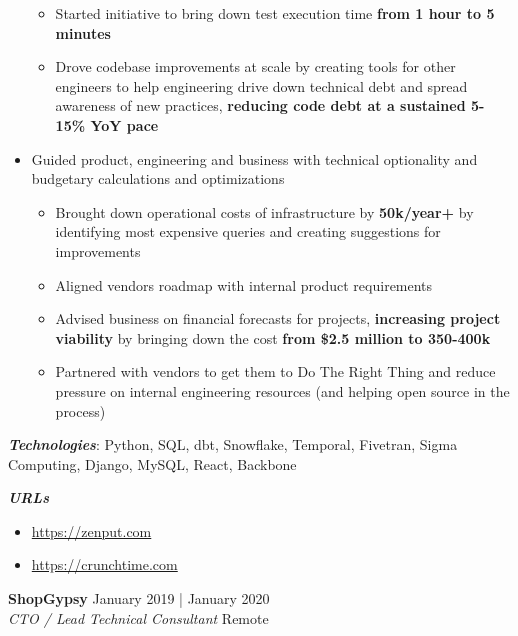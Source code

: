 \documentclass[a4paper]{article}
\newenvironment{jobdetails}%
    {\list{}{\leftmargin=4mm}\item[]}%
    {\endlist}
\begin{document}
\begin{jobdetails}
\begin{itemize}
\begin{itemize}
            \item Started initiative to bring down test execution time \textbf{from 1 hour to 5 minutes}
            \item Drove codebase improvements at scale by creating tools for other engineers to help engineering drive down technical debt and spread awareness of new practices, \textbf{reducing code debt at a sustained 5-15\% YoY pace}
        \end{itemize}
    \item Guided product, engineering and business with technical optionality and budgetary calculations and optimizations
        \begin{itemize}
            \item Brought down operational costs of infrastructure by \textbf{50k/year+} by identifying most expensive queries and creating suggestions for improvements
            \item Aligned vendors roadmap with internal product requirements
            \item Advised business on financial forecasts for projects, \textbf{increasing project viability} by bringing down the cost \textbf{from \$2.5 million to 350-400k}
            \item Partnered with vendors to get them to Do The Right Thing and reduce pressure on internal engineering resources (and helping open source in the process)
        \end{itemize}
\end{itemize}
\vspace{2mm}

\textbf{\textit{Technologies}}: Python, SQL, dbt, Snowflake, Temporal, Fivetran, Sigma Computing, Django, MySQL, React, Backbone

\textbf{\textit{URLs}}
\begin{itemize} \itemsep 1pt
	\item \url{https://zenput.com}
	\item \url{https://crunchtime.com}
\end{itemize}

\end{jobdetails}
\vspace{1mm}


\pagebreak




\textbf{ShopGypsy} \hfill January 2019 | January 2020 \\
\textit{CTO / Lead Technical Consultant} \hfill Remote \\
\vspace{2mm}
\end{document}
